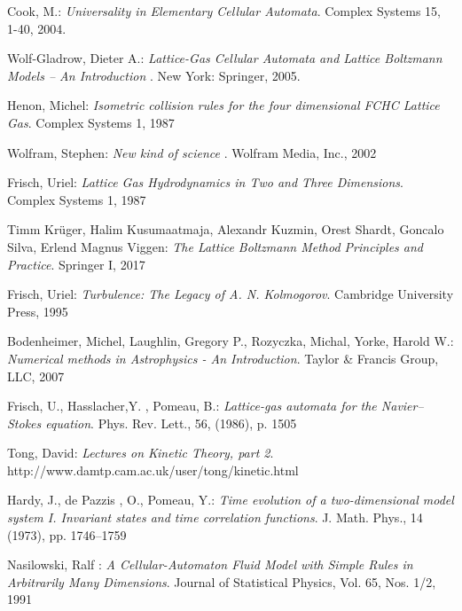 \documentclass[12pt,a4paper,fleqn]{report}
\begin{document}
\begin{thebibliography}{99}
 
{\sc Cook,} M.:
\emph{Universality in Elementary Cellular Automata}. 
Complex Systems 15, 1-40, 2004. 
 
   {\sc Wolf-Gladrow,} Dieter A.:
   \emph{ Lattice-Gas Cellular Automata and Lattice Boltzmann Models -- An Introduction }.
   New York: Springer, 2005.

   {\sc Henon,} Michel:
   \emph{ Isometric collision rules for the four dimensional FCHC Lattice Gas}.
   Complex Systems 1, 1987

   {\sc Wolfram,} Stephen:
   \emph{ New kind of science }.
   Wolfram Media, Inc., 2002

   {\sc Frisch,} Uriel:
   \emph{ Lattice Gas Hydrodynamics in Two and Three Dimensions}.
   Complex Systems 1, 1987
   
   {\sc Timm Krüger, Halim Kusumaatmaja, Alexandr Kuzmin, Orest Shardt, Goncalo Silva, Erlend Magnus Viggen}:
   \emph{ The Lattice Boltzmann Method Principles and Practice}.
   Springer I, 2017   
   
   {\sc Frisch,} Uriel:
   \emph{ Turbulence: The Legacy of A. N. Kolmogorov}.
   Cambridge University Press, 1995  

   {\sc Bodenheimer,} Michel, {\sc Laughlin,} Gregory P., {\sc Rozyczka,} Michal, {\sc Yorke,} Harold W.:
   \emph{ Numerical methods in Astrophysics - An Introduction}.
   Taylor \& Francis Group, LLC, 2007

   {\sc Frisch,} U., {\sc  Hasslacher,}Y. , {\sc Pomeau,} B.:
   \emph{ Lattice-gas automata for the Navier–Stokes equation}.
   Phys. Rev. Lett., 56, (1986), p. 1505

   {\sc Tong,} David:
   \emph{ Lectures on Kinetic Theory, part 2}.
   http://www.damtp.cam.ac.uk/user/tong/kinetic.html
   
   {\sc Hardy,} J., {\sc de Pazzis	,} O., {\sc Pomeau}, Y.:
   \emph{ Time evolution of a two-dimensional model system I. Invariant states and time correlation functions}.
   J. Math. Phys., 14 (1973), pp. 1746–1759
    
   
   {\sc Nasilowski,} Ralf :
   \emph{ A Cellular-Automaton Fluid Model with Simple Rules in Arbitrarily Many Dimensions}.
   Journal of Statistical Physics, Vol. 65, Nos. 1/2, 1991



\end{thebibliography}
\end{document}
